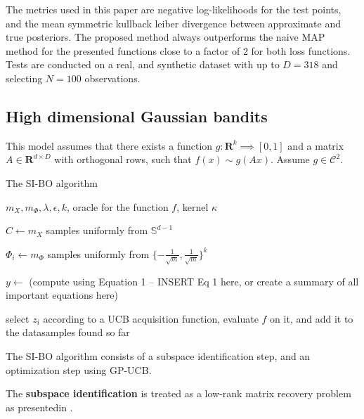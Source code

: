 The metrics used in this paper are negative log-likelihoods for the test points, and the mean symmetric kullback leiber divergence between approximate and true posteriors.
The proposed method always outperforms the naive MAP method for the presented functions close to a factor of 2 for both loss functions.
Tests are conducted on a real, and synthetic dataset with up to $D = 318$ and selecting $N = 100$ observations. 

\subsection{High dimensional Gaussian bandits}

\citep{Djolonga2013} This model assumes that there exists a function $g : \mathbf{R}^k \implies [0, 1]$ and a matrix $A \in \mathbf{R}^{d \times D}$ with orthogonal rows, such that $f(x) \sim g(Ax) $. Assume $g \in \mathcal{C}^2$. 

\begin{algorithm}
\caption{The SI-BO algorithm \citep{Djolonga2013}}

\begin{algorithmic} 
\REQUIRE $m_X, m_{\Phi}, \lambda, \epsilon, k$, oracle for the function $f$, kernel $\kappa$ 

\STATE $C \leftarrow m_X $ samples uniformly from $\mathbb{S}^{d-1}$

\STATE $\Phi_i \leftarrow m_{\Phi}$ samples uniformly from $\{ -\frac{1}{\sqrt{m}}, \frac{1}{\sqrt{m}} \}^k$
\ENDFOR

\STATE $ y \leftarrow $ (compute using Equation 1 -- INSERT Eq 1 here, or create a summary of all important equations here)

\STATE select $z_i$ according to a UCB acquisition function, evaluate $f$ on it, and add it to the datasamples found so far

\end{algorithmic}

\end{algorithm}

The SI-BO algorithm consists of a subspace identification step, and an optimization step using GP-UCB.


The \textbf{subspace identification} is treated as a low-rank matrix recovery problem as presentedin \citep{CevherSubspaceIdentificationKrause}.


